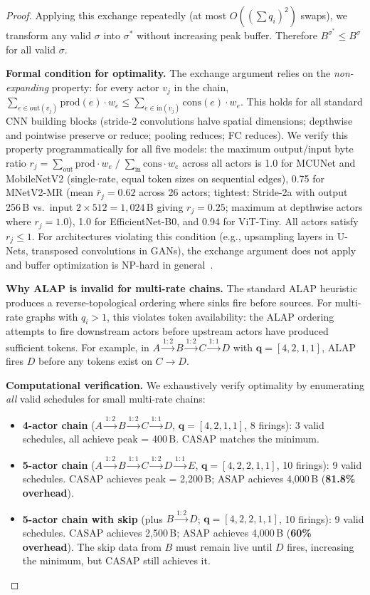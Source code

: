 \documentclass[journal]{IEEEtran}
\begin{document}
\begin{proof}
Applying this exchange repeatedly (at most $O((\sum q_i)^2)$ swaps), we transform any valid $\sigma$ into $\sigma^*$ without increasing peak buffer. Therefore $B^{\sigma^*} \leq B^{\sigma}$ for all valid $\sigma$.

\textbf{Formal condition for optimality.}
The exchange argument relies on the \emph{non-expanding} property: for every actor $v_j$ in the chain, $\sum_{e \in \mathrm{out}(v_j)} \mathrm{prod}(e) \cdot w_e \leq \sum_{e \in \mathrm{in}(v_j)} \mathrm{cons}(e) \cdot w_e$. This holds for all standard CNN building blocks (stride-2 convolutions halve spatial dimensions; depthwise and pointwise preserve or reduce; pooling reduces; FC reduces). We verify this property programmatically for all five models: the maximum output/input byte ratio $r_j = \sum_{\mathrm{out}} \mathrm{prod} \cdot w_e \;/\; \sum_{\mathrm{in}} \mathrm{cons} \cdot w_e$ across all actors is 1.0 for MCUNet and MobileNetV2 (single-rate, equal token sizes on sequential edges), 0.75 for MNetV2-MR (mean $\bar{r}_j = 0.62$ across 26 actors; tightest: Stride-2a with output 256\,B vs.\ input $2 \times 512 = 1{,}024$\,B giving $r_j = 0.25$; maximum at depthwise actors where $r_j = 1.0$), 1.0 for EfficientNet-B0, and 0.94 for ViT-Tiny.
All actors satisfy $r_j \leq 1$. For architectures violating this condition (e.g., upsampling layers in U-Nets, transposed convolutions in GANs), the exchange argument does not apply and buffer optimization is NP-hard in general~\cite{murthy2004buffer}.

\textbf{Why ALAP is invalid for multi-rate chains.}
The standard ALAP heuristic produces a reverse-topological ordering where sinks fire before sources.
For multi-rate graphs with $q_i > 1$, this violates token availability: the ALAP ordering attempts to fire downstream actors before upstream actors have produced sufficient tokens.
For example, in $A \xrightarrow{1:2} B \xrightarrow{1:2} C \xrightarrow{1:1} D$ with $\mathbf{q} = [4, 2, 1, 1]$, ALAP fires $D$ before any tokens exist on $C \to D$.

\textbf{Computational verification.}
We exhaustively verify optimality by enumerating \emph{all} valid schedules for small multi-rate chains:
\begin{itemize}[nosep]
\item \textbf{4-actor chain} ($A \xrightarrow{1:2} B \xrightarrow{1:2} C \xrightarrow{1:1} D$, $\mathbf{q} = [4,2,1,1]$, 8 firings): 3 valid schedules, all achieve peak = 400\,B. CASAP matches the minimum.
\item \textbf{5-actor chain} ($A \xrightarrow{1:2} B \xrightarrow{1:1} C \xrightarrow{1:2} D \xrightarrow{1:1} E$, $\mathbf{q} = [4,2,2,1,1]$, 10 firings): 9 valid schedules. CASAP achieves peak = 2{,}200\,B; ASAP achieves 4{,}000\,B (\textbf{81.8\% overhead}).
\item \textbf{5-actor chain with skip} (plus $B \xrightarrow{1:2} D$; $\mathbf{q} = [4,2,2,1,1]$, 10 firings): 9 valid schedules. CASAP achieves 2{,}500\,B; ASAP achieves 4{,}000\,B (\textbf{60\% overhead}). The skip data from $B$ must remain live until $D$ fires, increasing the minimum, but CASAP still achieves it.
\end{itemize}


\end{proof}
\end{document}
